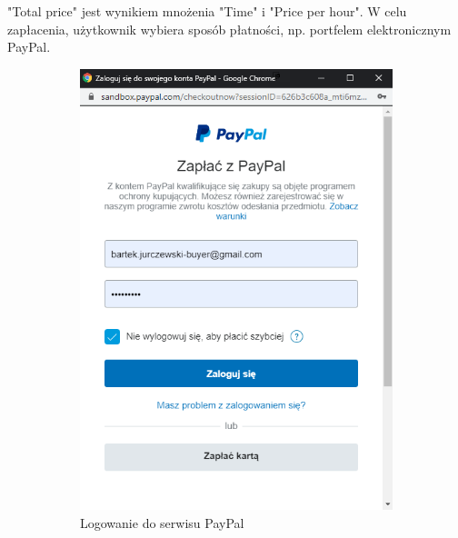 \documentclass[12pt]{article}
\numberwithin{figure}{section}
\begin{document}
\begin{sloppypar}
"Total price" jest wynikiem mnożenia "Time" i "Price per hour". W celu zapłacenia, użytkownik wybiera sposób płatności, np. portfelem elektronicznym PayPal.

\begin{figure}[H]
    \centering
    \begin{subfigure}{.5\textwidth}
      \centering
      \includegraphics[width=.9\linewidth]{images/chapter_4/pay1.png}
      \caption{Logowanie do serwisu PayPal}
      \label{fig:paypal1}
    \end{subfigure}%
    \begin{subfigure}{.5\textwidth}
      \centering

\end{subfigure}
\end{figure}
\end{sloppypar}
\end{document}

